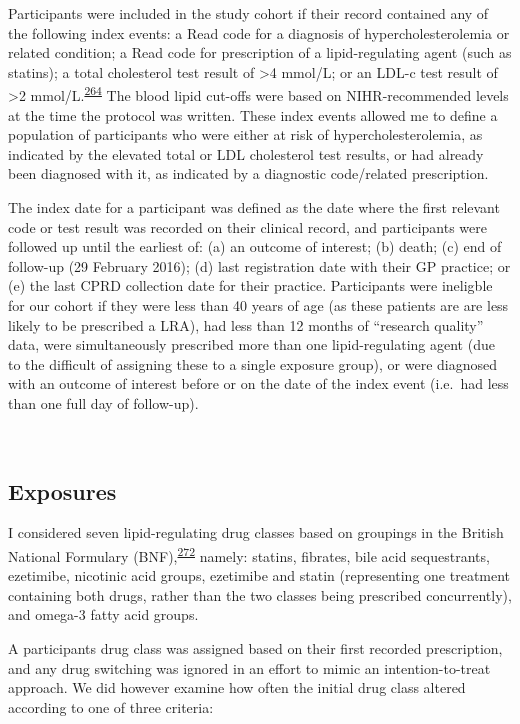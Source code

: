 \documentclass[a4paper, twoside]{templates/ociamthesis}
\begin{document}
Participants were included in the study cohort if their record contained any of the following index events: a Read code for a diagnosis of hypercholesterolemia or related condition; a Read code for prescription of a lipid-regulating agent (such as statins); a total cholesterol test result of \textgreater4 mmol/L; or an LDL-c test result of \textgreater2 mmol/L.\textsuperscript{\protect\hyperlink{ref-walker2016}{264}} The blood lipid cut-offs were based on NIHR-recommended levels at the time the protocol was written. These index events allowed me to define a population of participants who were either at risk of hypercholesterolemia, as indicated by the elevated total or LDL cholesterol test results, or had already been diagnosed with it, as indicated by a diagnostic code/related prescription.

The index date for a participant was defined as the date where the first relevant code or test result was recorded on their clinical record, and participants were followed up until the earliest of: (a) an outcome of interest; (b) death; (c) end of follow-up (29 February 2016); (d) last registration date with their GP practice; or (e) the last CPRD collection date for their practice. Participants were ineligble for our cohort if they were less than 40 years of age (as these patients are are less likely to be prescribed a LRA), had less than 12 months of ``research quality'' data, were simultaneously prescribed more than one lipid-regulating agent (due to the difficult of assigning these to a single exposure group), or were diagnosed with an outcome of interest before or on the date of the index event (i.e.~had less than one full day of follow-up).

~

\hypertarget{exposures}{%
\subsection{Exposures}\label{exposures}}

I considered seven lipid-regulating drug classes based on groupings in the British National Formulary (BNF),\textsuperscript{\protect\hyperlink{ref-wishart2017}{272}} namely: statins, fibrates, bile acid sequestrants, ezetimibe, nicotinic acid groups, ezetimibe and statin (representing one treatment containing both drugs, rather than the two classes being prescribed concurrently), and omega-3 fatty acid groups.

A participants drug class was assigned based on their first recorded prescription, and any drug switching was ignored in an effort to mimic an intention-to-treat approach. We did however examine how often the initial drug class altered according to one of three criteria:
\end{document}
